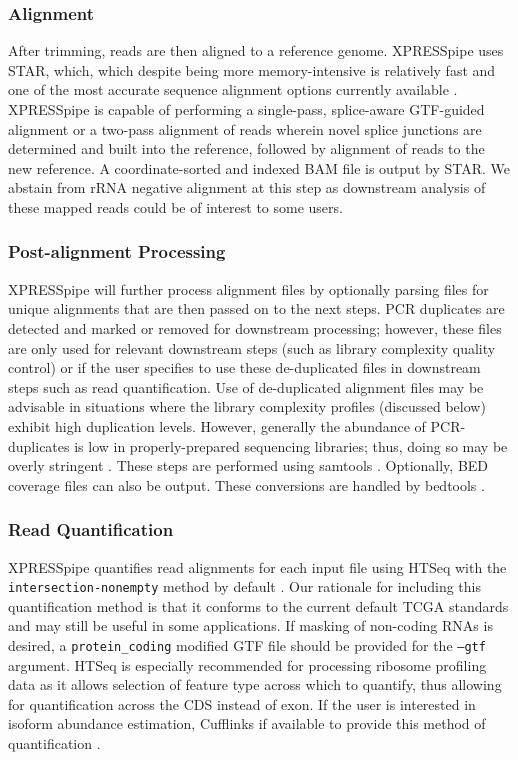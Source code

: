 \documentclass[10pt, oneside]{article}
\begin{document}
\subsubsection{Alignment}
After trimming, reads are then aligned to a reference genome. XPRESSpipe uses STAR, which, which despite being more memory-intensive is relatively fast and one of the most accurate sequence alignment options currently available \cite{star, baruzzo_natmeth}. XPRESSpipe is capable of performing a single-pass, splice-aware GTF-guided alignment or a two-pass alignment of reads wherein novel splice junctions are determined and built into the reference, followed by alignment of reads to the new reference. A coordinate-sorted and indexed BAM file is output by STAR. We abstain from rRNA negative alignment at this step as downstream analysis of these mapped reads could be of interest to some users.

\subsubsection{Post-alignment Processing}
XPRESSpipe will further process alignment files by optionally parsing files for unique alignments that are then passed on to the next steps. PCR duplicates are detected and marked or removed for downstream processing; however, these files are only used for relevant downstream steps (such as library complexity quality control) or if the user specifies to use these de-duplicated files in downstream steps such as read quantification. Use of de-duplicated alignment files may be advisable in situations where the library complexity profiles (discussed below) exhibit high duplication levels. However, generally the abundance of PCR-duplicates is low in properly-prepared sequencing libraries; thus, doing so may be overly stringent \cite{umi}. These steps are performed using samtools \cite{samtools}. Optionally, BED coverage files can also be output. These conversions are handled by bedtools \cite{bedtools}.

\subsubsection{Read Quantification}
XPRESSpipe quantifies read alignments for each input file using HTSeq with the \texttt{intersection-nonempty} method by default \cite{htseq, count_benchmark}. Our rationale for including this quantification method is that it conforms to the current default TCGA standards and may still be useful in some applications. If masking of non-coding RNAs is desired, a \texttt{protein\_coding} modified GTF file should be provided for the \texttt{--gtf} argument. HTSeq is especially recommended for processing ribosome profiling data as it allows selection of feature type across which to quantify, thus allowing for quantification across the CDS instead of exon. If the user is interested in isoform abundance estimation, Cufflinks if available to provide this method of quantification \cite{cufflinks, count_benchmark}.
\end{document}
